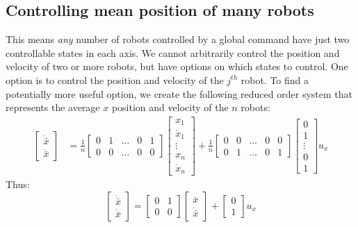 \subsection{Controlling mean position of many robots}\label{sec:controlMeanPosition}
This means \emph{any} number of robots controlled by a global command have just two controllable states in each axis. We cannot arbitrarily control the position and velocity of two or more robots, but have options on which states to control.  One option is to control the position and velocity of the $j^{th}$ robot. To find a potentially more useful option, we create the following reduced order system that represents the average $x$ position and velocity of the $n$ robots:
\begin{align}
\begin{bmatrix}\nonumber
\dot{\bar{x}} \\
\ddot{\bar{x}}
\end{bmatrix} &= \frac{1}{n} \begin{bmatrix}
0& 1& \ldots &0& 1 \\
0& 0& \ldots &0& 0
\end{bmatrix}
\begin{bmatrix}
x_{1}\\
\dot{x}_{1}\\
\vdots\\
x_{n}\\
\dot{x}_{n}
\end{bmatrix} 
+ \frac{1}{n}\begin{bmatrix}
0& 0&  \ldots &0& 0 \\
0& 1&  \ldots &0& 1
\end{bmatrix}\begin{bmatrix} 
0\\
1\\
\vdots\\
0\\
1
\end{bmatrix} u_x
\end{align}
Thus:
\begin{equation}
\begin{bmatrix}
\dot{\bar{x}} \\
\ddot{\bar{x}}
\end{bmatrix} = \begin{bmatrix}
0& 1 \\
0& 0
\end{bmatrix}
\begin{bmatrix}
\bar{x}\\
\dot{\bar{x}}
\end{bmatrix} + \begin{bmatrix} 
0\\
1
\end{bmatrix} u_x
\end{equation}

